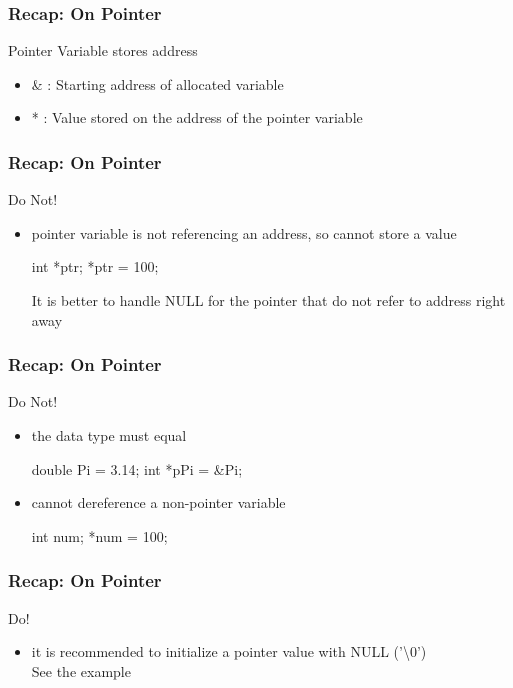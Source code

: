 \documentclass[newPxFont,sthlmFooter,nooffset]{beamer}
\begin{document}
\begin{frame}[t, fragile]
  \frametitle{Recap: On Pointer}
Pointer Variable stores address
\begin{itemize}
\item \& : Starting address of allocated variable
\item * : Value stored on the address of the pointer variable
\end{itemize}

\end{frame}


\begin{frame}[t, fragile]
  \frametitle{Recap: On Pointer}
  Do Not!
  \begin{itemize}
  \item pointer variable is not referencing an address, so cannot store a value
\begin{codedef}
int *ptr;
*ptr = 100;
\end{codedef}
It is better to handle NULL for the pointer that do not refer to address right away
\end{itemize}
\end{frame}

\begin{frame}[t, fragile]
\frametitle{Recap: On Pointer}
Do Not!
\begin{itemize}
\item the data type must equal
\begin{codedef}
double Pi = 3.14;
int *pPi = &Pi; 
\end{codedef}
\item cannot dereference a non-pointer variable
\begin{codedef}
int num;
*num = 100;  
\end{codedef}
\end{itemize}
\end{frame}

\begin{frame}[t, fragile]
  \frametitle{Recap: On Pointer}
Do!
  \begin{itemize}
\item it is recommended to initialize a pointer value with NULL ('\textbackslash 0') \\ 
See the example
  \end{itemize}

\end{frame}
\end{document}
